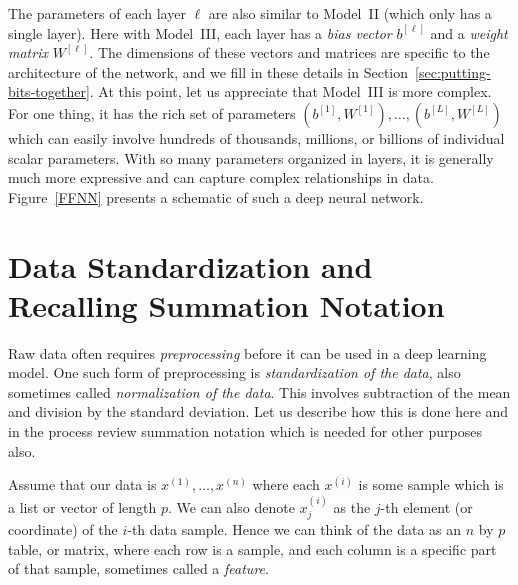 \documentclass[12pt]{article}
\begin{document}
The parameters of each layer $\ell$ are also similar to Model~II (which only has a single layer). Here with Model~III, each layer has a {\em bias vector} $b^{[\ell]}$ and a {\em weight matrix} $W^{[\ell]}$. The dimensions of these vectors and matrices are specific to the architecture of the network, and we fill in these details in Section~\ref{sec:putting-bits-together}. At this point, let us appreciate that Model~III is more complex. For one thing, it has the rich set of parameters $(b^{[1]}, W^{[1]}), \ldots, (b^{[L]}, W^{[L]})$ which can easily involve hundreds of thousands, millions, or billions of individual scalar parameters.  With so many parameters organized in layers, it is generally much more expressive and can capture complex relationships in data. Figure~\ref{FFNN} presents a schematic of such a deep neural network.

\section{Data Standardization and Recalling Summation Notation}
\label{sec:summation}
Raw data often requires \textit{preprocessing} before it can be used in a deep learning model. One such form of preprocessing is \textit{standardization of the data}, also sometimes called \textit{normalization of the data}. This involves subtraction of the mean and division by the standard deviation. Let us describe how this is done here and in the process review summation notation which is needed for other purposes also.

Assume that our data is $x^{(1)}, \ldots, x^{(n)}$ where each $x^{(i)}$ is some sample which is a list or vector of length $p$. We can also denote $x_j^{(i)}$ as the $j$-th element (or coordinate) of the $i$-th data sample. Hence we can think of the data as an $n$ by $p$ table, or matrix, where each row is a sample, and each column is a specific part of that sample, sometimes called a {\em feature}.
\end{document}
